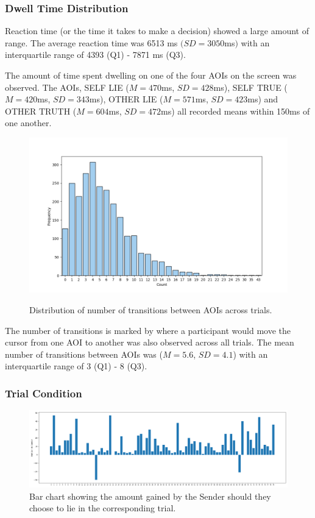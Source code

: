 \documentclass[man, floatsintext]{apa7}
\begin{document}
\subsubsection{Dwell Time Distribution}

Reaction time (or the time it takes to make a decision) showed a large amount of range. The average reaction time was 6513 ms $(SD = 3050$ms$)$ with an interquartile range of 4393 (Q1) - 7871 ms (Q3).

The amount of time spent dwelling on one of the four AOIs on the screen was observed. The AOIs, SELF LIE ($M = 470$ms, $SD = 428$ms), SELF TRUE ($M = 420$ms, $SD = 343$ms), OTHER LIE ($M = 571$ms, $SD = 423$ms) and OTHER TRUTH ($M = 604$ms, $SD = 472$ms) all recorded means within 150ms of one another. 

\begin{figure}[H]
	\centering
	\caption{Distribution of number of transitions between AOIs across trials.}
	\includegraphics[width=0.65\linewidth]{../plots/Dwell/N_TransitionsDistPlot.png}
	\label{fig:NTransitionsDistPlot}
\end{figure}

The number of transitions is marked by where a participant would move the cursor from one AOI to another was also observed across all trials. The mean number of transitions between AOIs was ($M = 5.6$, $SD = 4.1$) with an interquartile range of 3 (Q1) - 8 (Q3).

\subsubsection{Trial Condition}

\begin{figure}[H]
	\includegraphics[width=\linewidth]{../plots/TrialIndex/Gains.png}
	\caption{Bar chart showing the amount gained by the Sender should they choose to lie in the corresponding trial.}
	\label{fig:Gains}
\end{figure}
\end{document}
